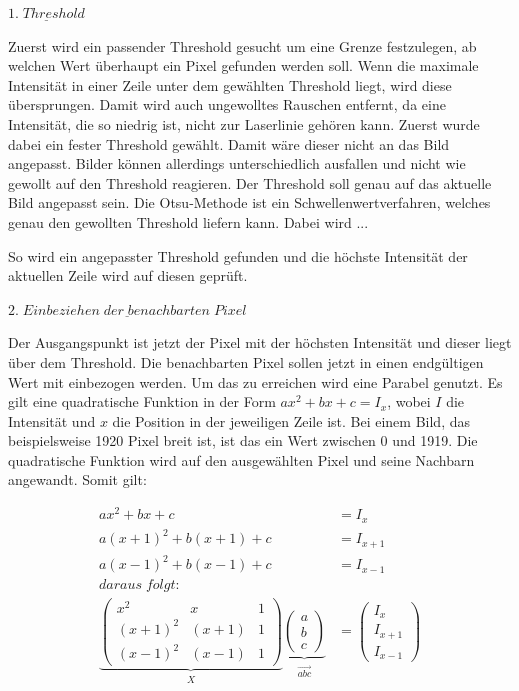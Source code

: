 		$\underline{1. \; Threshold}$
		
		Zuerst wird ein passender Threshold gesucht um eine Grenze festzulegen, ab welchen Wert überhaupt ein Pixel gefunden werden soll. Wenn die maximale Intensität in einer Zeile unter dem gewählten Threshold liegt, wird diese übersprungen. Damit wird auch ungewolltes Rauschen entfernt, da eine Intensität, die so niedrig ist, nicht zur Laserlinie gehören kann. Zuerst wurde dabei ein fester Threshold gewählt. Damit wäre dieser nicht an das Bild angepasst. Bilder können allerdings unterschiedlich ausfallen und nicht wie gewollt auf den Threshold reagieren. Der Threshold soll genau auf das aktuelle Bild angepasst sein. Die Otsu-Methode ist ein Schwellenwertverfahren, welches genau den gewollten Threshold liefern kann. Dabei wird ...
		
		So wird ein angepasster Threshold gefunden und die höchste Intensität der aktuellen Zeile wird auf diesen geprüft.
		
		$\underline{2. \; Einbeziehen \; der \; benachbarten \; Pixel}$
		
		Der Ausgangspunkt ist jetzt der Pixel mit der höchsten Intensität und dieser liegt über dem Threshold. Die benachbarten Pixel sollen jetzt in einen endgültigen Wert mit einbezogen werden. Um das zu erreichen wird eine Parabel genutzt. Es gilt eine quadratische Funktion in der Form \( ax^2 + bx + c = I_x \), wobei \( I \) die Intensität und \( x \) die Position in der jeweiligen Zeile ist. Bei einem Bild, das beispielsweise 1920 Pixel breit ist, ist das ein Wert zwischen 0 und 1919. Die quadratische Funktion wird auf den ausgewählten Pixel und seine Nachbarn angewandt. Somit gilt:
		
		\begin{equation}
			\begin{aligned}
				ax^2 + bx + c &= I_x \\
				a(x+1)^2 + b(x+1) + c &= I_{x+1} \\
				a(x-1)^2 + b(x-1) + c &= I_{x-1} \\
				daraus \; folgt: \\
				\underbrace{\begin{pmatrix}
					x^2 & x & 1 \\
					(x+1)^2 & (x+1) & 1 \\
					(x-1)^2 & (x-1) & 1 
				\end{pmatrix}}_{\substack{X}} \underbrace{ \begin{pmatrix}
					a \\
					b \\
					c
				\end{pmatrix}}_{\substack{\vec{abc}}} &= \begin{pmatrix}
					I_x \\
					I_{x+1} \\
					I_{x-1}
				\end{pmatrix}
			\end{aligned}
			\label{eq:subpixel_x}
		\end{equation}
		
